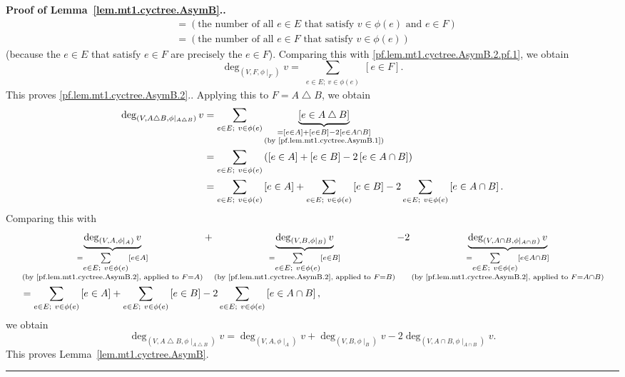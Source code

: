 \documentclass[numbers=enddot,12pt,final,onecolumn,notitlepage]{scrartcl}%
\theoremstyle{definition}
\newenvironment{proof}[1][Proof]{\noindent\textbf{#1.} }{\ \rule{0.5em}{0.5em}}
\let\sumnonlimits\sum
\renewcommand{\sum}{\sumnonlimits\limits}
\newcommand{\tup}[1]{\left( #1 \right)}
\newcommand{\ive}[1]{\left[ #1 \right]}
\newcommand{\underbrack}[2]{\underbrace{#1}_{\substack{#2}}}
\begin{document}
\begin{proof}[Proof of Lemma~\ref{lem.mt1.cyctree.AsymB}.]
{\begin{align*}
&= \tup{\text{the number of all } e \in E \text{ that satisfy }
          v \in \phi\tup{e} \text{ and } e \in F} \\
&= \tup{\text{the number of all } e \in F \text{ that satisfy }
          v \in \phi\tup{e}}
\end{align*}
(because the $e \in E$ that satisfy $e \in F$ are precisely the
$e \in F$). Comparing this with
\eqref{pf.lem.mt1.cyctree.AsymB.2.pf.1}, we obtain
\[
\deg_{\tup{V, F, \phi\mid_F}} v
= \sum_{\substack{e \in E;\ v \in \phi\tup{e}}} \ive{e \in F} .
\]
This proves \eqref{pf.lem.mt1.cyctree.AsymB.2}.}.
Applying this to $F = A \bigtriangleup B$, we obtain
\begin{align*}
\deg_{\tup{V, A \bigtriangleup B, \phi\mid_{A \bigtriangleup B}}} v
&= \sum_{\substack{e \in E;\ v \in \phi\tup{e}}}
         \underbrack{\ive{e \in A \bigtriangleup B}}
                    {= \ive{e \in A} + \ive{e \in B}
                         - 2 \ive{e \in A \cap B} \\
                     \text{(by \eqref{pf.lem.mt1.cyctree.AsymB.1})}}
         \\
&= \sum_{\substack{e \in E;\ v \in \phi\tup{e}}}
         \tup{\ive{e \in A} + \ive{e \in B} - 2 \ive{e \in A \cap B}}
         \\
&= \sum_{\substack{e \in E;\ v \in \phi\tup{e}}} \ive{e \in A}
   + \sum_{\substack{e \in E;\ v \in \phi\tup{e}}} \ive{e \in B}
   - 2 \sum_{\substack{e \in E;\ v \in \phi\tup{e}}}
                \ive{e \in A \cap B} .
\end{align*}
Comparing this with
\begin{align*}
&
\underbrack{\deg_{\tup{V, A, \phi\mid_A}} v}
           {= \sum_{\substack{e \in E;\ v \in \phi\tup{e}}}
                    \ive{e \in A} \\
            \text{(by \eqref{pf.lem.mt1.cyctree.AsymB.2}, applied to }
            F = A \text{)}}
+
\underbrack{\deg_{\tup{V, B, \phi\mid_B}} v}
           {= \sum_{\substack{e \in E;\ v \in \phi\tup{e}}}
                    \ive{e \in B} \\
            \text{(by \eqref{pf.lem.mt1.cyctree.AsymB.2}, applied to }
            F = B \text{)}}
-
2 \underbrack{\deg_{\tup{V, A \cap B, \phi\mid_{A \cap B}}} v}
             {= \sum_{\substack{e \in E;\ v \in \phi\tup{e}}}
                      \ive{e \in A \cap B} \\
              \text{(by \eqref{pf.lem.mt1.cyctree.AsymB.2}, applied to }
              F = A \cap B \text{)}} \\
&= \sum_{\substack{e \in E;\ v \in \phi\tup{e}}} \ive{e \in A}
   + \sum_{\substack{e \in E;\ v \in \phi\tup{e}}} \ive{e \in B}
   - 2 \sum_{\substack{e \in E;\ v \in \phi\tup{e}}}
                \ive{e \in A \cap B} ,
\end{align*}
we obtain
\[
\deg_{\tup{V, A \bigtriangleup B, \phi\mid_{A \bigtriangleup B}}} v
= \deg_{\tup{V, A, \phi\mid_A}} v
  + \deg_{\tup{V, B, \phi\mid_B}} v
  - 2 \deg_{\tup{V, A \cap B, \phi\mid_{A \cap B}}} v.
\]
This proves Lemma~\ref{lem.mt1.cyctree.AsymB}.
\end{proof}
\end{document}
